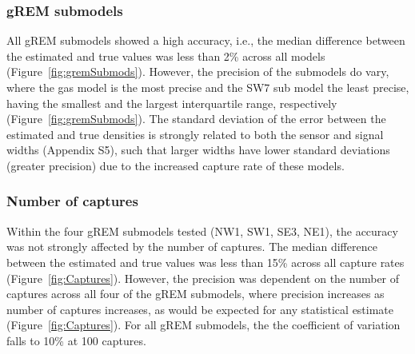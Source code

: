 \subsubsection{gREM submodels}
All gREM submodels showed a high accuracy, i.e., the median difference between the estimated and true values was less than 2\% across all models (Figure~\ref{fig:gremSubmods}).
However, the precision of the submodels do vary, where the gas model is the most precise and the SW7 sub model the least precise, having the smallest and the largest interquartile range, respectively (Figure~\ref{fig:gremSubmods}).
The standard deviation of the error between the estimated and true densities is strongly related to both the sensor and signal widths (Appendix S5), such that larger widths have lower standard deviations (greater precision) due to the increased capture rate of these models.



\begin{knitrout}\footnotesize
{}\color{fgcolor}\begin{kframe}


{\ttfamily\noindent\bfseries{}}\end{kframe}
\end{knitrout}


\subsubsection{Number of captures}

Within the four gREM submodels tested (NW1, SW1, SE3, NE1), the accuracy was not strongly affected by the number of captures.
The median difference between the estimated and true values was less than 15\% across all capture rates (Figure~\ref{fig:Captures}).
However, the precision was dependent on the number of captures across all four of the gREM submodels, where precision increases as number of captures increases, as would be expected for any statistical estimate (Figure~\ref{fig:Captures}).
For all gREM submodels, the the coefficient of variation falls to 10\% at 100 captures. 



